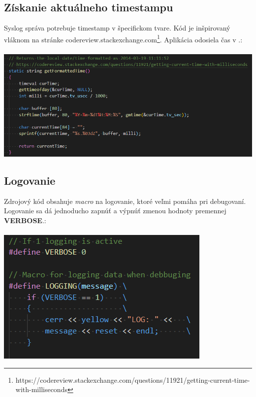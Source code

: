 \documentclass{article}
\begin{document}
        \newpage

        \subsection{Získanie aktuálneho timestampu}
        Syslog správa potrebuje timestamp v špecifickom tvare. Kód je inšpirovaný vláknom na stránke
        codereview.stackexchange.com\footnote{https://codereview.stackexchange.com/questions/11921/getting-current-time-with-milliseconds}. Aplikácia
        odosiela čas v .:\\\\
        \includegraphics[scale=0.6]{timestamp.png}

        \subsection{Logovanie}
        Zdrojový kód obsahuje \emph{macro} na logovanie, ktoré veľmi pomáha pri debugovaní. Logovanie sa dá jednoducho zapnúť a výpnúť zmenou hodnoty
        premennej \textbf{VERBOSE}.:\\\\
        \includegraphics[scale=0.6]{log.png}

        \newpage
\end{document}
